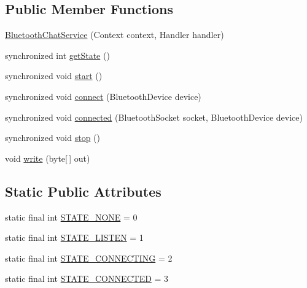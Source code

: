 \subsection*{Public Member Functions}
\begin{DoxyCompactItemize}
\item 
\hyperlink{classcom_1_1example_1_1android_1_1_bluetooth_chat_1_1_bluetooth_chat_service_a82aeace1fb85fa6450790cb18d9154e8}{Bluetooth\-Chat\-Service} (Context context, Handler handler)
\item 
synchronized int \hyperlink{classcom_1_1example_1_1android_1_1_bluetooth_chat_1_1_bluetooth_chat_service_a6a50c2d9aca011bf98c1ef858548b905}{get\-State} ()
\item 
synchronized void \hyperlink{classcom_1_1example_1_1android_1_1_bluetooth_chat_1_1_bluetooth_chat_service_ae3e5313b36e6f003857174584df1753e}{start} ()
\item 
synchronized void \hyperlink{classcom_1_1example_1_1android_1_1_bluetooth_chat_1_1_bluetooth_chat_service_a210e75ad8ad1a78004ee6fe643acd0aa}{connect} (Bluetooth\-Device device)
\item 
synchronized void \hyperlink{classcom_1_1example_1_1android_1_1_bluetooth_chat_1_1_bluetooth_chat_service_a7684309f45e8b4bbbe3478b7c6b7d786}{connected} (Bluetooth\-Socket socket, Bluetooth\-Device device)
\item 
synchronized void \hyperlink{classcom_1_1example_1_1android_1_1_bluetooth_chat_1_1_bluetooth_chat_service_a4bcef6dec76484d625984ace718f36fd}{stop} ()
\item 
void \hyperlink{classcom_1_1example_1_1android_1_1_bluetooth_chat_1_1_bluetooth_chat_service_a8f39f71b4e3de075a0b64236eb5ec876}{write} (byte\mbox{[}$\,$\mbox{]} out)
\end{DoxyCompactItemize}
\subsection*{Static Public Attributes}
\begin{DoxyCompactItemize}
\item 
static final int \hyperlink{classcom_1_1example_1_1android_1_1_bluetooth_chat_1_1_bluetooth_chat_service_acca6c8882253f023c0c4a78c76e07a5d}{S\-T\-A\-T\-E\-\_\-\-N\-O\-N\-E} = 0
\item 
static final int \hyperlink{classcom_1_1example_1_1android_1_1_bluetooth_chat_1_1_bluetooth_chat_service_a5b119ac8b511b1ccc522ad84810097fd}{S\-T\-A\-T\-E\-\_\-\-L\-I\-S\-T\-E\-N} = 1
\item 
static final int \hyperlink{classcom_1_1example_1_1android_1_1_bluetooth_chat_1_1_bluetooth_chat_service_a3f330f5177bb8c94ae6c8796c4839e0c}{S\-T\-A\-T\-E\-\_\-\-C\-O\-N\-N\-E\-C\-T\-I\-N\-G} = 2
\item 
static final int \hyperlink{classcom_1_1example_1_1android_1_1_bluetooth_chat_1_1_bluetooth_chat_service_a65bee812daa1c06904d2bfc9b6c98607}{S\-T\-A\-T\-E\-\_\-\-C\-O\-N\-N\-E\-C\-T\-E\-D} = 3
\end{DoxyCompactItemize}
